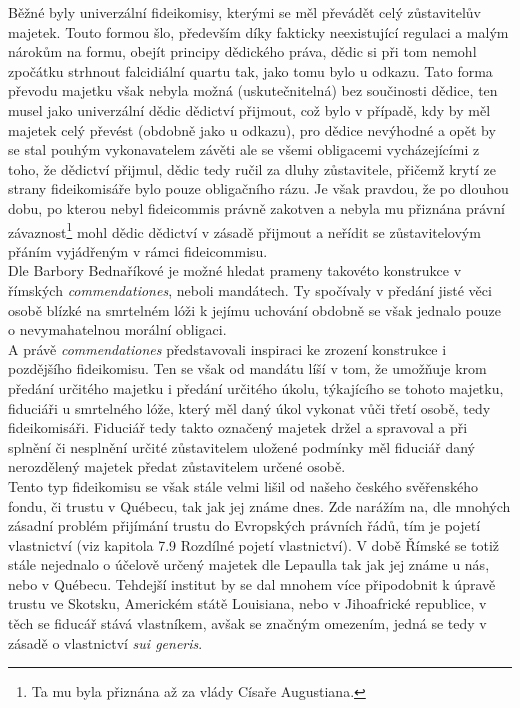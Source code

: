 \documentclass{article}
\begin{document}
Běžné byly univerzální fideikomisy, kterými se měl převádět celý zůstavitelův majetek. Touto formou šlo, především díky fakticky neexistující regulaci a malým nárokům na formu, obejít principy dědického práva, dědic si při tom nemohl zpočátku strhnout falcidiální quartu tak, jako tomu bylo u odkazu. Tato forma převodu majetku však nebyla možná (uskutečnitelná) bez součinosti dědice, ten musel jako univerzální dědic dědictví přijmout, což bylo v případě, kdy by měl majetek celý převést (obdobně jako u odkazu), pro dědice nevýhodné a opět by se stal pouhým vykonavatelem závěti ale se všemi obligacemi vycházejícími z toho, že dědictví přijmul, dědic tedy ručil za dluhy zůstavitele, přičemž krytí ze strany fideikomisáře bylo pouze obligačního rázu. Je však pravdou, že po dlouhou dobu, po kterou nebyl fideicommis právně zakotven a nebyla mu přiznána právní závaznost\footnote{Ta mu byla přiznána až za vlády Císaře Augustiana.} mohl dědic dědictví v zásadě přijmout a neřídit se zůstavitelovým přáním vyjádřeným v rámci fideicommisu.\\

Dle Barbory Bednaříkové je možné hledat prameny takovéto konstrukce v římských \textit{commendationes}, neboli mandátech. Ty spočívaly v předání jisté věci osobě blízké na smrtelném lóži k jejímu uchování obdobně se však jednalo pouze o nevymahatelnou morální obligaci.\\


A právě \textit{commendationes} představovali inspiraci ke zrození konstrukce i pozdějšího fideikomisu. Ten se však od mandátu líší v tom, že umožňuje krom předání určitého majetku i předání určitého úkolu, týkajícího se tohoto majetku, fiduciáři u smrtelného lóže, který měl daný úkol vykonat vůči třetí osobě, tedy fideikomisáři. Fiduciář tedy takto označený majetek držel a spravoval a při splnění či nesplnění určité zůstavitelem uložené podmínky měl fiduciář daný nerozdělený majetek předat zůstavitelem určené osobě.\\

Tento typ fideikomisu se však stále velmi lišil od našeho českého svěřenského fondu, či trustu v Québecu, tak jak jej známe dnes. Zde narážím na, dle mnohých zásadní problém přijímání trustu do Evropských právních řádů, tím je pojetí vlastnictví (viz kapitola 7.9 Rozdílné pojetí vlastnictví). V době Římské se totiž stále nejednalo o účelově určený majetek dle Lepaulla tak jak jej známe u nás, nebo v Québecu. Tehdejší institut by se dal mnohem více připodobnit k úpravě trustu ve Skotsku, Americkém státě Louisiana, nebo v Jihoafrické republice, v těch se fiducář stává vlastníkem, avšak se značným omezením, jedná se tedy v zásadě o vlastnictví \textit{sui generis}.\\
\end{document}
